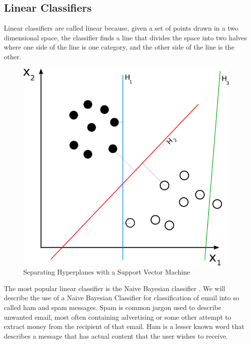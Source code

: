 \documentclass[12pt]{article}
\begin{document}
\subsection{Linear Classifiers}
Linear classifiers are called linear because, given a set of points drawn in a two dimensional space, the
classifier finds a line that divides the space into two halves where one side of the line is one category, and
the other side of the line is the other.\\
\begin{figure}[center]
  \centering
\includegraphics[scale=.4,natwidth=628,natheight=600]{svm_separating_hyperplanes.png}  
  \caption{Separating Hyperplanes with a Support Vector Machine}
\end{figure}

The most popular linear classifier is the Naive Bayesian classifier \citep{kononenko1991semi}.
We will describe the use of a Naive Bayesian Classifier for classification of email into so called ham and
spam messages. Spam is common jargon used to describe unwanted email, most often containing advertising or
some other attempt to extract money from the recipient of that email. Ham is a lesser known word that
describes a message that has actual content that the user wishes to receive.
\end{document}

